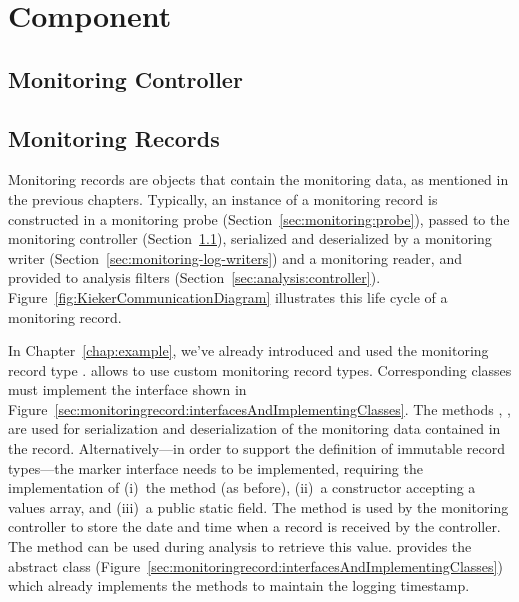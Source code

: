 %


\chapter{\KiekerMonitoringPart{} Component}\label{chap:componentsMonitoring}


\section{Monitoring Controller}\label{sec:componentsMonitoring:monitoringController}

\section{Monitoring Records}\label{sec:componentsMonitoring:monitoringRecords}

Monitoring records are objects that contain the monitoring data, as mentioned %
in the previous chapters. Typically, an instance of a monitoring record is %
constructed in a monitoring probe (Section~\ref{sec:monitoring:probe}), %
passed to the monitoring controller (Section~\ref{sec:componentsMonitoring:monitoringController}), %
serialized and deserialized by a monitoring %
writer (Section~\ref{sec:monitoring-log-writers}) and a
monitoring reader, and provided to analysis filters (Section~\ref{sec:analysis:controller}). %
Figure~\ref{fig:KiekerCommunicationDiagram} illustrates this life cycle of a monitoring %
record. %

In Chapter~\ref{chap:example}, we've already introduced and used the monitoring %
record type . \Kieker{} allows to use custom %
monitoring record types. Corresponding classes must implement the %
interface  shown in Figure~\ref{sec:monitoringrecord:interfacesAndImplementingClasses}. %
The methods , ,  %
are used for serialization and deserialization of the monitoring data contained %
in the record. Alternatively---in order to support the definition of immutable record types---the %
marker interface  needs to be implemented, requiring the %
implementation of (i)~the  method (as before), (ii)~a %
constructor accepting a values array, and (iii)~a public static  %
field. The method  is used by the monitoring controller to %
store the date and time when a record is received by the controller. %
The method  can be used during analysis to retrieve %
this value. \KiekerMonitoringPart{} provides the abstract class %
 (Figure~\ref{sec:monitoringrecord:interfacesAndImplementingClasses}) %
which already implements the methods to maintain the logging timestamp.


